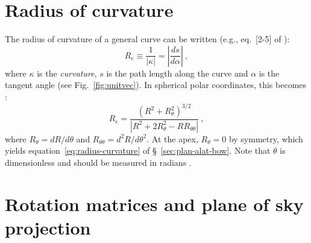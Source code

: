 \documentclass[useAMS, usenatbib, a4paper]{mnras}
\newcommand\C{\ensuremath{\mathrm{c}}}
\providecommand{\abs}[1]{\lvert#1\rvert}
\providecommand{\Abs}[1]{\left\lvert#1\right\rvert}
\begin{document}
\appendix

\section{Radius of curvature}
\label{sec:radius-curvature}

The radius of curvature of a general curve can be written (e.g.,
eq.~[2-5] of \citealp{Guggenheimer:2012a}):
\begin{equation}
  \label{eq:Rcurv-general}
  R_{\C} \equiv \frac{1}{\abs{\kappa}} = \Abs{\frac{d s}{d \alpha}} \ ,  
\end{equation}
where \(\kappa\) is the \textit{curvature}, \(s\) is the path length along
the curve and \(\alpha\) is the tangent angle (see Fig.~\ref{fig:unitvec}).
In spherical polar coordinates, this becomes \citep{Weisstein:2018a}:
\begin{equation}
  \label{eq:Rcurv-polar}
  R_{\C} = \frac{\left( R^2 + R_\theta^2 \right)^{3/2}}
  {\Abs{R^2 + 2 R_\theta^2 - R R_{\theta\theta}}} \ , 
\end{equation}
where \(R_\theta = d R / d \theta\) and
\(R_{\theta\theta} = d^2 R / d \theta^2\).  At the apex,
\(R_\theta = 0\) by symmetry, which yields
equation~\eqref{eq:radius-curvature} of
\S~\ref{sec:plan-alat-bow}. Note that \(\theta\) is dimensionless and
should be measured in radians \citep{Mohr:2015a, Quincey:2017a}.


\section{Rotation matrices and plane of sky projection}
\label{sec:plane-sky-projection}
\end{document}
